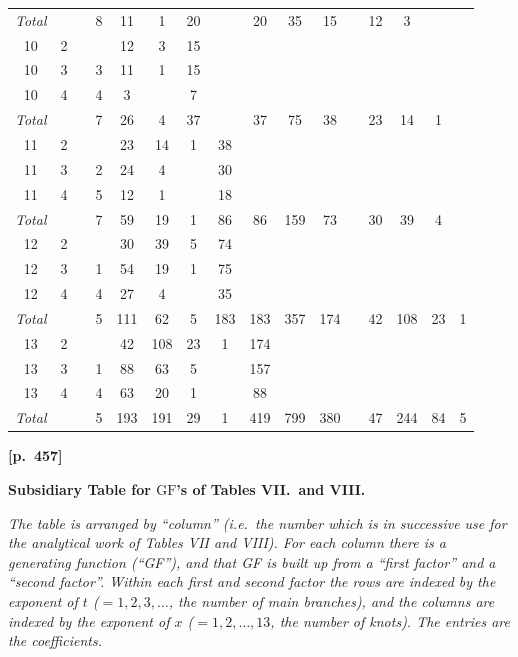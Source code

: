 \documentclass[11pt,a4paper]{article}
\providecommand{\GF}{\mathrm{GF}}
\begin{document}
{\begin{longtable}{c c | c c c c c c | c c c | c c c c c}
\textit{Total} & & & 8 & 11 & 1 & 20 & & 20 & 35 & 15 & & 12 & 3 & & \\
10 & 2 & & & 12 & 3 & 15 & & & & & & & & & \\
10 & 3 & & 3 & 11 & 1 & 15 & & & & & & & & & \\
10 & 4 & & 4 & 3 &   & 7  & & & & & & & & & \\
\textit{Total} & & & 7 & 26 & 4 & 37 & & 37 & 75 & 38 & & 23 & 14 & 1 & \\
11 & 2 & & & 23 & 14 & 1 & 38 & & & & & & & & \\
11 & 3 & & 2 & 24 & 4 &   & 30 & & & & & & & & \\
11 & 4 & & 5 & 12 & 1 &   & 18 & & & & & & & & \\
\textit{Total} & & & 7 & 59 & 19 & 1 & 86 & 86 & 159 & 73 & & 30 & 39 & 4 & \\
12 & 2 & & & 30 & 39 & 5 & 74 & & & & & & & & \\
12 & 3 & & 1 & 54 & 19 & 1 & 75 & & & & & & & & \\
12 & 4 & & 4 & 27 & 4 &   & 35 & & & & & & & & \\
\textit{Total} & & & 5 & 111 & 62 & 5 & 183 & 183 & 357 & 174 & & 42 & 108 & 23 & 1 \\
13 & 2 & & & 42 & 108 & 23 & 1 & 174 & & & & & & & \\
13 & 3 & & 1 & 88 & 63 & 5 &   & 157 & & & & & & & \\
13 & 4 & & 4 & 63 & 20 & 1 &   &  88 & & & & & & & \\
\textit{Total} & & & 5 & 193 & 191 & 29 & 1 & 419 & 799 & 380 & & 47 & 244 & 84 & 5 \\
\hline
\end{longtable}
}

\bigskip
\noindent\textbf{[p.~457]}\quad

\begin{center}
\textbf{Subsidiary Table for $\GF$'s of Tables VII.\ and VIII.}
\end{center}

\noindent\textit{The table is arranged by ``column'' (i.e.\ the number which is in successive use for the analytical work of Tables VII and VIII).   For each column there is a generating function (``GF''), and that GF is built up from a ``first factor'' and a ``second factor''.   Within each first and second factor the rows are indexed by the exponent of $t$ ($=1,2,3,\ldots$, the number of main branches), and the columns are indexed by the exponent of $x$ ($=1,2,\ldots,13$, the number of knots).   The entries are the coefficients.}
\end{document}
